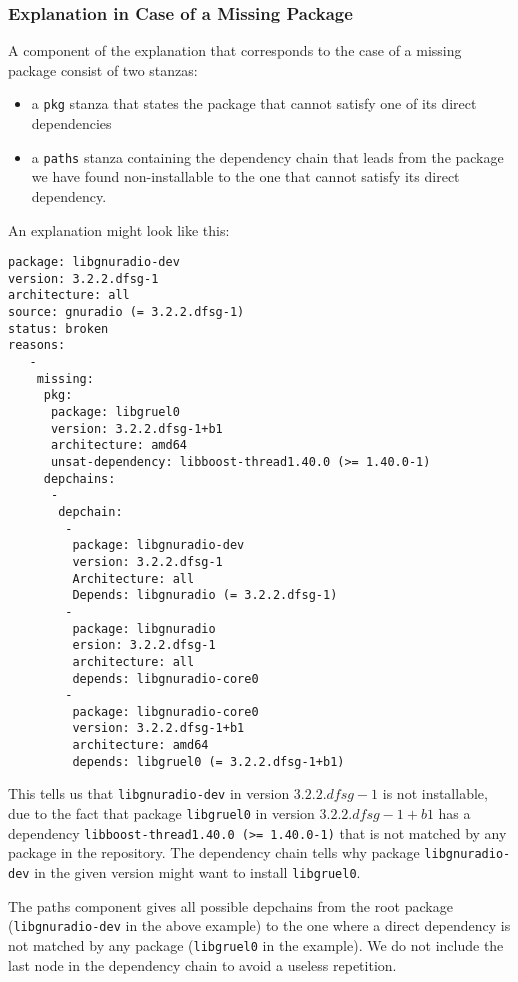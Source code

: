 \subsubsection{Explanation in Case of a Missing Package}
A component of the explanation that corresponds to the case of a
missing package consist of two stanzas:
\begin{itemize}
\item a \texttt{pkg} stanza that states the package that cannot satisfy
  one of its direct dependencies
\item a \texttt{paths} stanza containing the dependency chain that
  leads from the package we have found non-installable to the one that
  cannot satisfy its direct dependency.
\end{itemize}
\begin{example}
An explanation might look like this:
\begin{verbatim}
package: libgnuradio-dev
version: 3.2.2.dfsg-1
architecture: all
source: gnuradio (= 3.2.2.dfsg-1)
status: broken
reasons:
   -
    missing:
     pkg:
      package: libgruel0
      version: 3.2.2.dfsg-1+b1
      architecture: amd64
      unsat-dependency: libboost-thread1.40.0 (>= 1.40.0-1)
     depchains:
      -
       depchain:
        -
         package: libgnuradio-dev
         version: 3.2.2.dfsg-1
         Architecture: all
         Depends: libgnuradio (= 3.2.2.dfsg-1)
        -
         package: libgnuradio
         ersion: 3.2.2.dfsg-1
         architecture: all
         depends: libgnuradio-core0
        -
         package: libgnuradio-core0
         version: 3.2.2.dfsg-1+b1
         architecture: amd64
         depends: libgruel0 (= 3.2.2.dfsg-1+b1)
\end{verbatim}
This tells us that \texttt{libgnuradio-dev} in version $3.2.2.dfsg-1$
is not installable, due to the fact that package \texttt{libgruel0}
in version $3.2.2.dfsg-1+b1$ has a dependency
\texttt{libboost-thread1.40.0 (>= 1.40.0-1)} that is not matched by
any package in the repository. The dependency chain tells why package
\texttt{libgnuradio-dev} in the given version might want to install
\texttt{libgruel0}.
\end{example}

The paths component gives all possible depchains from the root package
(\texttt{libgnuradio-dev} in the above example) to the one where a
direct dependency is not matched by any package (\texttt{libgruel0} in
the example). We do not include the last node in the dependency chain
to avoid a useless repetition.

